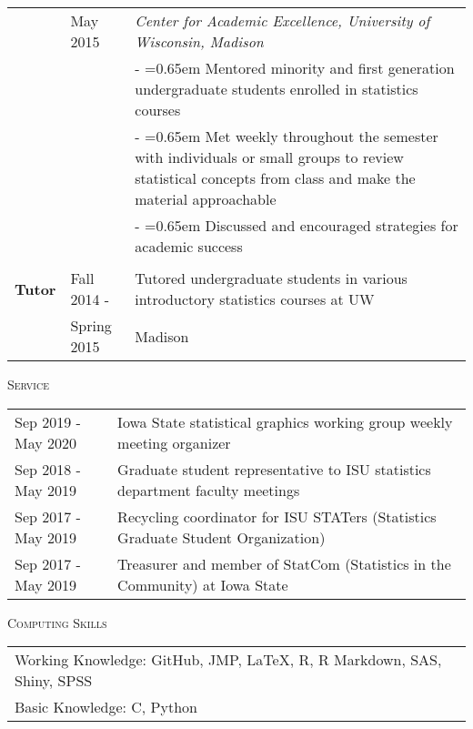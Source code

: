 \documentclass[10pt, oneside]{article}
\begin{document}
\begin{longtable}{p{1.4cm}p{2.1cm}p{13cm}}
& \hfill{May 2015} & \emph{Center for Academic Excellence, University of Wisconsin, Madison} \vspace{0.1cm}\\
& & - \hangindent=0.65em \hangafter=1 Mentored minority and first generation undergraduate students enrolled in statistics courses\\
& & - \hangindent=0.65em \hangafter=1 Met weekly throughout the semester with individuals or small groups to review statistical concepts from class and make the material approachable\\
& & - \hangindent=0.65em \hangafter=1 Discussed and encouraged strategies for academic success\\
\\
\textbf{Tutor} & \hfill{Fall 2014 -} & Tutored undergraduate students in various introductory statistics courses at UW \\
& \hfill{Spring 2015} & Madison
\end{longtable}

\noindent \textsc{Service} \hrulefill
\begin{longtable}{p{3.5cm}p{13cm}}
\hfill{Sep 2019 - May 2020} & Iowa State statistical graphics working group weekly meeting organizer\\
\hfill{Sep 2018 - May 2019} & Graduate student representative to ISU statistics department faculty meetings\\
\hfill{Sep 2017 - May 2019} & Recycling coordinator for ISU STATers (Statistics Graduate Student Organization)\\
\hfill{Sep 2017 - May 2019} & Treasurer and member of StatCom (Statistics in the Community) at Iowa State
\end{longtable}

\noindent \textsc{Computing Skills} \hrulefill
\begin{longtable}{p{16.5cm}}
Working Knowledge: GitHub, JMP, \LaTeX, R, R Markdown, SAS, Shiny, SPSS\\
Basic Knowledge: C, Python
\end{longtable}
\end{document}

